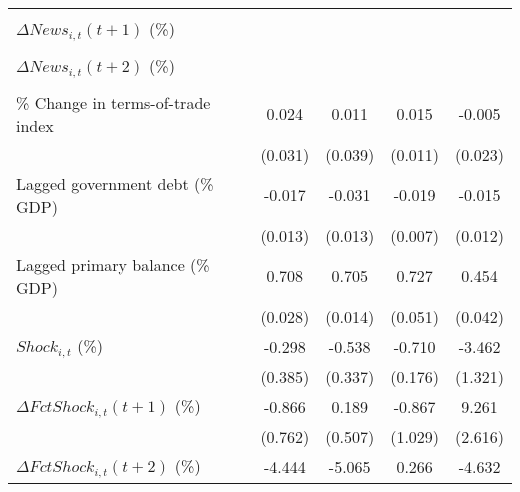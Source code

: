 {\begin{tabular}{l*{4}{c}}
                    &                     &                     &                     &                     \\
\addlinespace
$ \Delta News_{i,t}(t+1)$ (\%)&                     &                     &                     &                     \\
                    &                     &                     &                     &                     \\
\addlinespace
$ \Delta News_{i,t}(t+2)$ (\%)&                     &                     &                     &                     \\
                    &                     &                     &                     &                     \\
\addlinespace
\% Change in terms-of-trade index&       0.024         &       0.011         &       0.015         &      -0.005         \\
                    &     (0.031)         &     (0.039)         &     (0.011)         &     (0.023)         \\
\addlinespace
Lagged government debt (\% GDP)&      -0.017         &      -0.031\sym{**} &      -0.019\sym{**} &      -0.015         \\
                    &     (0.013)         &     (0.013)         &     (0.007)         &     (0.012)         \\
\addlinespace
Lagged primary balance (\% GDP)&       0.708\sym{***}&       0.705\sym{***}&       0.727\sym{***}&       0.454\sym{***}\\
                    &     (0.028)         &     (0.014)         &     (0.051)         &     (0.042)         \\
\addlinespace
$ Shock_{i,t}$ (\%) &      -0.298         &      -0.538         &      -0.710\sym{***}&      -3.462\sym{**} \\
                    &     (0.385)         &     (0.337)         &     (0.176)         &     (1.321)         \\
\addlinespace
$ \Delta FctShock_{i,t}(t+1)$ (\%)&      -0.866         &       0.189         &      -0.867         &       9.261\sym{***}\\
                    &     (0.762)         &     (0.507)         &     (1.029)         &     (2.616)         \\
\addlinespace
$ \Delta FctShock_{i,t}(t+2)$ (\%)&      -4.444\sym{*}  &      -5.065\sym{*}  &       0.266         &      -4.632         \\

\end{tabular}}
